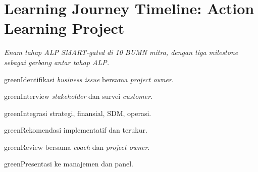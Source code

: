 \Needspace{11cm}
\section{Learning Journey Timeline: Action Learning Project}
\textit{Enam tahap ALP SMART-gated di 10 BUMN mitra, dengan tiga milestone sebagai gerbang antar tahap ALP.}
\begin{tcbraster}[raster columns=3,raster equal height=rows,raster column skip=2mm,raster row skip=2mm]
\begin{infobox}{green}Identifikasi \textit{business issue} bersama \textit{project owner}.\end{infobox}
\begin{infobox}{green}Interview \textit{stakeholder} dan survei \textit{customer}.\end{infobox}
\begin{infobox}{green}Integrasi strategi, finansial, SDM, operasi.\end{infobox}
\begin{infobox}{green}Rekomendasi implementatif dan terukur.\end{infobox}
\begin{infobox}{green}Review bersama \textit{coach} dan \textit{project owner}.\end{infobox}
\begin{infobox}{green}Presentasi ke manajemen dan panel.\end{infobox}
\end{tcbraster}
